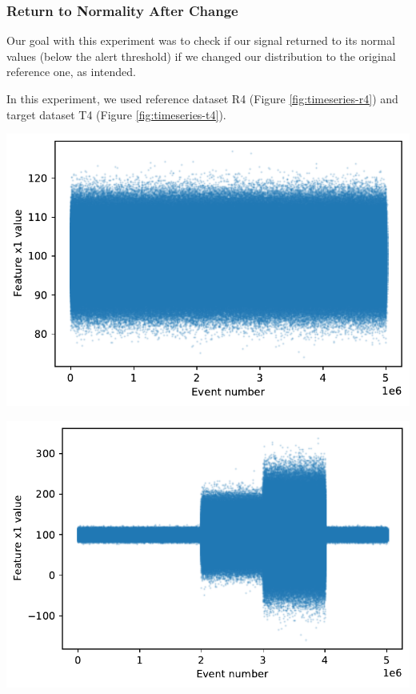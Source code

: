 \subsubsection{Return to Normality After Change}
Our goal with this experiment was to check if our signal returned to its normal values (below the alert threshold) if we changed our distribution to the original reference one, as intended.

In this experiment, we used reference dataset R4 (Figure \ref{fig:timeseries-r4}) and target dataset T4 (Figure \ref{fig:timeseries-t4}). 
\begin{center}
\begin{minipage}{.5\textwidth}
  \centering
  \includegraphics[width=1\linewidth]{figures/timeseries-r4.pdf}
  \label{fig:timeseries-r4}
\end{minipage}%
\begin{minipage}{.5\textwidth}
  \centering
  \includegraphics[width=1\linewidth]{figures/timeseries-t4.pdf}
  \label{fig:timeseries-t4}
\end{minipage}
\end{center}

